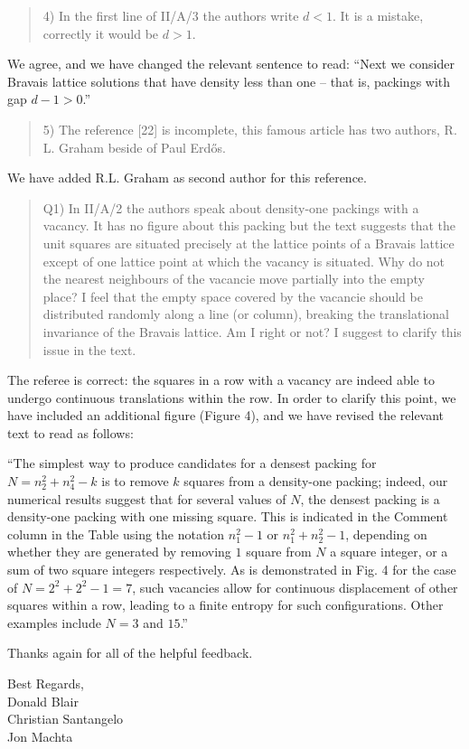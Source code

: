 \documentclass[12pt]{article}
\begin{document}
\begin{quote}
4) In the first line of II/A/3 the authors write $d<1$. It is a mistake, correctly it would be $d>1$.
\end{quote}

We agree, and we have changed the relevant sentence to read: ``Next we consider Bravais lattice solutions that have density less than one -- that is, packings with gap $d-1 > 0$.''

\begin{quote}
5) The reference [22] is incomplete, this famous article has two authors, R.
L. Graham beside of Paul Erd\H{o}s.
\end{quote}

We have added R.L. Graham as second author for this reference.

\begin{quote}
Q1) In II/A/2 the authors speak about density-one packings with a vacancy. It has no figure about this packing but the text suggests that the unit squares are situated precisely at the lattice points of a Bravais lattice except of one lattice point at which the vacancy is situated. Why do not the nearest neighbours of the vacancie move partially into the empty place? I feel that the empty space covered by the vacancie should be distributed randomly along a line (or column), breaking the translational invariance of the Bravais lattice. Am I right or not? I suggest to clarify this issue in the text.
\end{quote}

The referee is correct: the squares in a row with a vacancy are indeed able to undergo continuous translations within the row. In order to clarify this point, we have included an additional figure (Figure 4), and we have revised the relevant text to read as follows: 

``The simplest way to produce candidates for a densest packing for $N=n_2^2 + n_4^2-k$ is to remove $k$ squares from a density-one packing; indeed, our numerical results suggest that for several values of $N$, the densest packing is a density-one packing with one missing square.  This is indicated in the Comment column in the Table using the notation $n_1^2-1$ or $n_1^2+ n_2^2-1$, depending on whether they are generated by removing $1$ square from $N$ a square integer, or a sum of two square integers respectively.  As is demonstrated in Fig. 4 for the case of $N=2^2+2^2-1=7$, such vacancies allow for continuous displacement of other squares within a row, leading to a finite entropy for such configurations.  Other examples include $N=3$ and $15$.''

Thanks again for all of the helpful feedback.

Best Regards,\\
Donald Blair\\
Christian Santangelo\\
Jon Machta\\
\end{document}
